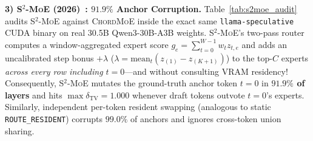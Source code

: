 \documentclass[10pt,twocolumn]{article}
\theoremstyle{definition}
\begin{document}
\begin{table}[t]
  \centering
  \caption{Controlled audit on live Qwen3-4B $\to$ Qwen3-30B-A3B speculative decoding ($1,344$ verification layer-windows on NVIDIA A40, $32\%$ VRAM cache metric).}
  \label{tab:s2moe_audit}
  \footnotesize
  \setlength{\tabcolsep}{3.5pt}
\end{table}

\vspace{2pt}
\noindent\textbf{3) \textsc{S$^2$-MoE} (2026)~\cite{s2moe2026}: $91.9\%$ Anchor Corruption.}
Table~\ref{tab:s2moe_audit} audits \textsc{S$^2$-MoE} against \textsc{ChordMoE} inside the exact same \texttt{llama-speculative} CUDA binary on real 30.5B Qwen3-30B-A3B weights. \textsc{S$^2$-MoE}'s two-pass router computes a window-aggregated expert score $g_e = \sum_{t=0}^{W-1} w_t z_{t,e}$ and adds an uncalibrated step bonus $+\lambda$ ($\lambda = \text{mean}_t(z_{(1)} - z_{(K+1)})$) to the top-$C$ experts \emph{across every row including $t=0$}—and without consulting VRAM residency! Consequently, \textsc{S$^2$-MoE} mutates the ground-truth anchor token $t=0$ in \textbf{$91.9\%$ of layers} and hits $\max \delta_{\mathrm{TV}} = 1.000$ whenever draft tokens outvote $t=0$'s experts. Similarly, independent per-token resident swapping (analogous to static \texttt{ROUTE\_RESIDENT}) corrupts $99.0\%$ of anchors and ignores cross-token union sharing.

\end{document}
